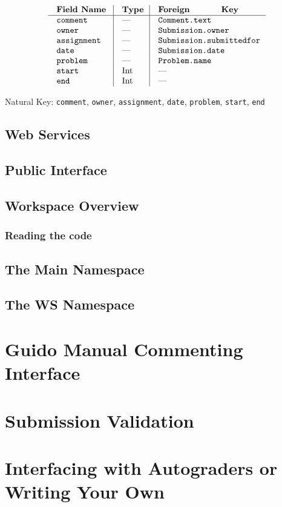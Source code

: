 $$\vbox{
  \offinterlineskip
  \halign{
    \strut \quad {\tt #}  & \vrule\quad #  & \vrule\quad # \cr
    {\bf Field Name}  & {\bf Type}  & {\bf Foreign Key}\cr
    \noalign{\hrule}    
    comment  & ---  & {\tt Comment.text} \cr
    owner & --- & {\tt Submission.owner} \cr
    assignment & --- & {\tt Submission.submittedfor} \cr
    date & --- & {\tt Submission.date} \cr
    problem  & ---  & {\tt Problem.name} \cr
    start  & Int  & --- \cr
    end  & Int  & --- \cr
  }
}$$

{\noindent
Natural Key: {\tt comment}, {\tt owner}, {\tt assignment}, {\tt date}, 
{\tt problem}, {\tt start}, {\tt end}\par}

\section{Web Services}

\section{Public Interface}

\section{Workspace Overview}

\subsection{Reading the code}

\section{The Main Namespace}

\section{The WS Namespace}

\chapter{Guido Manual Commenting Interface}

\chapter{Submission Validation}

\chapter{Interfacing with Autograders or Writing Your Own}

